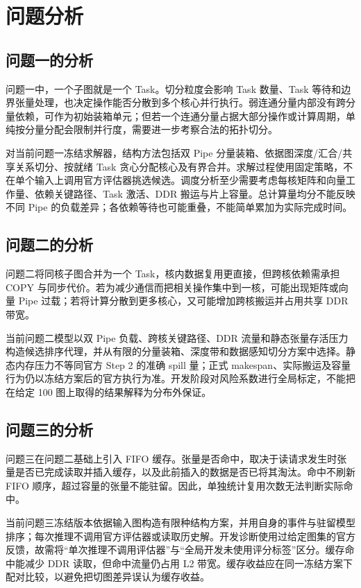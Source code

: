 \documentclass[UTF8,a4paper,zihao=-4]{ctexart}
\numberwithin{equation}{section}
\numberwithin{figure}{section}
\numberwithin{table}{section}
\begin{document}
\section{问题分析}
\subsection{问题一的分析}
问题一中，一个子图就是一个 Task。切分粒度会影响 Task 数量、Task 等待和边界张量处理，也决定操作能否分散到多个核心并行执行。弱连通分量内部没有跨分量依赖，可作为初始装箱单元；但若一个连通分量占据大部分操作或计算周期，单纯按分量分配会限制并行度，需要进一步考察合法的拓扑切分。

对当前问题一冻结求解器，结构方法包括双 Pipe 分量装箱、依据图深度/汇合/共享关系切分、按就绪 Task 贪心分配核心及有界合并。求解过程使用固定策略，不在单个输入上调用官方评估器挑选候选。调度分析至少需要考虑每核矩阵和向量工作量、依赖关键路径、Task 激活、DDR 搬运与片上容量。总计算量均分不能反映不同 Pipe 的负载差异；各依赖等待也可能重叠，不能简单累加为实际完成时间。

\subsection{问题二的分析}
问题二将同核子图合并为一个 Task，核内数据复用更直接，但跨核依赖需承担 COPY 与同步代价。若为减少通信而把相关操作集中到一核，可能出现矩阵或向量 Pipe 过载；若将计算分散到更多核心，又可能增加跨核搬运并占用共享 DDR 带宽。

当前问题二模型以双 Pipe 负载、跨核关键路径、DDR 流量和静态张量存活压力构造候选排序代理，并从有限的分量装箱、深度带和数据感知切分方案中选择。静态内存压力不等同官方 Step 2 的准确 spill 量；正式 makespan、实际搬运及容量行为仍以冻结方案后的官方执行为准。开发阶段对风险系数进行全局标定，不能把在给定 100 图上取得的结果解释为分布外保证。

\subsection{问题三的分析}
问题三在问题二基础上引入 FIFO 缓存。张量是否命中，取决于读请求发生时张量是否已完成读取并插入缓存，以及此前插入的数据是否已将其淘汰。命中不刷新 FIFO 顺序，超过容量的张量不能驻留。因此，单独统计复用次数无法判断实际命中。

当前问题三冻结版本依据输入图构造有限种结构方案，并用自身的事件与驻留模型排序；每次推理不调用官方评估器或读取历史解。开发诊断使用过给定图集的官方反馈，故需将“单次推理不调用评估器”与“全局开发未使用评分标签”区分。缓存命中能减少 DDR 读取，但命中流量仍占用 L2 带宽。缓存收益应在同一冻结方案下配对比较，以避免把切图差异误认为缓存收益。
\end{document}
